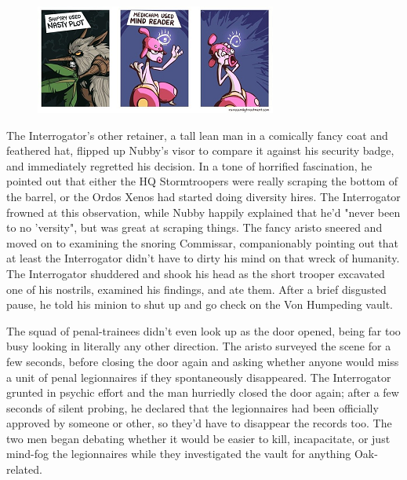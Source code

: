 \begin{figure}
	\begin{center}
		\includegraphics[width=\figwidth]{pics/21/92.png}
	\end{center}
\end{figure}
The Interrogator's other retainer, a tall lean man in a comically fancy coat and feathered hat, flipped up Nubby's visor to compare it against his security badge, and immediately regretted his decision. 
In a tone of horrified fascination, he pointed out that either the HQ Stormtroopers were really scraping the bottom of the barrel, or the Ordos Xenos had started doing diversity hires. 
The Interrogator frowned at this observation, while Nubby happily explained that he'd "never been to no 'versity", but was great at scraping things. 
The fancy aristo sneered and moved on to examining the snoring Commissar, companionably pointing out that at least the Interrogator didn't have to dirty his mind on that wreck of humanity. 
The Interrogator shuddered and shook his head as the short trooper excavated one of his nostrils, examined his findings, and ate them. 
After a brief disgusted pause, he told his minion to shut up and go check on the Von Humpeding vault.

The squad of penal-trainees didn't even look up as the door opened, being far too busy looking in literally any other direction. 
The aristo surveyed the scene for a few seconds, before closing the door again and asking whether anyone would miss a unit of penal legionnaires if they spontaneously disappeared. 
The Interrogator grunted in psychic effort and the man hurriedly closed the door again; 
after a few seconds of silent probing, he declared that the legionnaires had been officially approved by someone or other, so they'd have to disappear the records too. 
The two men began debating whether it would be easier to kill, incapacitate, or just mind-fog the legionnaires while they investigated the vault for anything Oak-related.

